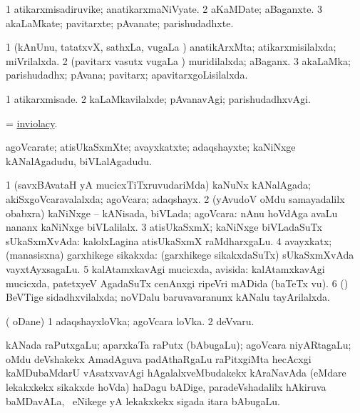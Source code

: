 \bentry
{}
\gl{\nA}
\bmng
\bnum
\num{1} atikarxmisadiruvike; anatikarxmaNiVyate. 
\num{2} aKaMDate; aBaganxte. 
\num{3} akaLaMkate; pavitarxte; pAvanate; parishudadhxte. 
\enum
\emng
\eentry

\bentry
{}
\gl{\gu}
\bmng
\bnum
\num{1} (kAnUnu, tatatxvX, sathxLa, \mo vugaLa \vi) anatikArxMta; atikarxmisilalxda; miVrilalxda. 
\num{2} (pavitarx vasutx \mo vugaLa \vi) muridilalxda; aBaganx. 
\num{3} akaLaMka; parishudadhx; pAvana; pavitarx; apavitarxgoLisilalxda. 
\enum
\emng
\eentry

\bentry
{}
\gl{\kirxvi}
\bmng
\bnum
\num{1} atikarxmisade. 
\num{2} kaLaMkavilalxde; pAvanavAgi; parishudadhxvAgi. 
\enum
\emng
\eentry

\bentry
{}
\gl{\nA}
\bmng
= \hyperlink{inviolacy}{inviolacy}. 
\emng
\eentry

\bentry
{}
\gl{\nA}
\bmng
agoVcarate; atisUkaSxmXte; avayxkatxte; adaqshayxte; kaNiNxge kANalAgadudu, biVLalAgadudu. 
\emng
\eentry

\bentry
{}
\gl{\gu}
\bmng
\bnum
\num{1} (savxBAvataH yA mucicxTiTxruvudariMda) kaNuNx kANalAgada; akiSxgoVcaravalalxda; agoVcara; adaqshayx. 
\num{2} (yAvudoV oMdu samayadalilx obabxra) kaNiNxge -- kANisada, biVLada; agoVcara:  nAnu hoVdAga avaLu nananx kaNiNxge biVLalilalx. 
\num{3} atisUkaSxmX; kaNiNxge biVLadaSuTx sUkaSxmXvAda:  kalolxLagina atisUkaSxmX raMdharxgaLu. 
\num{4} avayxkatx; (manasisxna) garxhikege sikakxda:  (garxhikege sikakxdaSuTx) sUkaSxmXvAda vayxtAyxsagaLu. 
\num{5} kalAtamxkavAgi mucicxda, avisida:  kalAtamxkavAgi mucicxda, patetxyeV AgadaSuTx cenAnxgi ripeVri mADida (baTeTx \mo vu). 
\num{6} (\pArxparx) BeVTige sidadhxvilalxda; noVDalu baruvavaranunx kANalu tayArilalxda. 
\enum
\emng
\eentry

\bentry
{}
\gl{\nA}
\bmng
( oDane) 
\bnum
\num{1} adaqshayxloVka; agoVcara loVka. 
\num{2} deVvaru. 
\enum
\emng
\eentry

\bentry
{}
\gl{\nA}
\bmng
kANada raPutxgaLu; aparxkaTa raPutx (bAbugaLu); agoVcara niyARtagaLu; oMdu deVshakekx AmadAguva padAthaRgaLu raPitxgiMta hecAcxgi kaMDubaMdarU vAsatxvavAgi hAgalalxveMbudakekx kAraNavAda (eMdare lekakxkekx sikakxde hoVda) haDagu bADige, paradeVshadalilx hAkiruva baMDavALa, \mo\ eNikege yA lekakxkekx sigada itara bAbugaLu. 
\emng
\eentry

